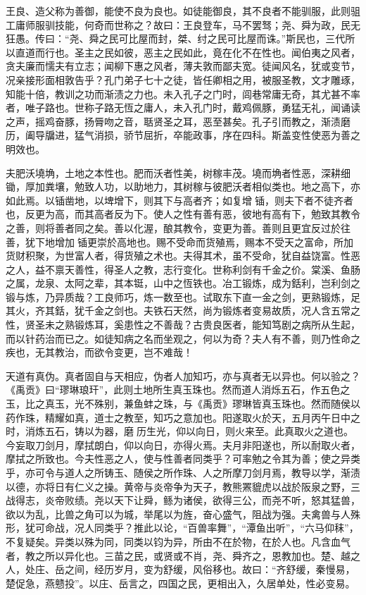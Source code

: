 \documentclass[]{article}
\begin{document}
王良、造父称为善御，能使不良为良也。如徒能御良，其不良者不能驯服，此则驵工庸师服驯技能，何奇而世称之？故曰：王良登车，马不罢驽；尧、舜为政，民无狂愚。传曰：``尧、舜之民可比屋而封，桀、纣之民可比屋而诛。''斯民也，三代所以直道而行也。圣主之民如彼，恶主之民如此，竟在化不在性也。闻伯夷之风者，贪夫廉而懦夫有立志；闻柳下惠之风者，薄夫敦而鄙夫宽。徒闻风名，犹或变节，况亲接形面相敦告乎？孔门弟子七十之徒，皆任卿相之用，被服圣教，文才雕琢，知能十倍，教训之功而渐渍之力也。未入孔子之门时，闾巷常庸无奇，其尤甚不率者，唯子路也。世称子路无恆之庸人，未入孔门时，戴鸡佩豚，勇猛无礼，闻诵读之声，摇鸡奋豚，扬脣吻之音，聒贤圣之耳，恶至甚矣。孔子引而教之，渐渍磨历，阖导牖进，猛气消损，骄节屈折，卒能政事，序在四科。斯盖变性使恶为善之明效也。

夫肥沃墝埆，土地之本性也。肥而沃者性美，树稼丰茂。墝而埆者性恶，深耕细锄，厚加粪壤，勉致人功，以助地力，其树稼与彼肥沃者相似类也。地之高下，亦如此焉。以锸凿地，以埤增下，则其下与高者齐；如复增锸，则夫下者不徒齐者也，反更为高，而其高者反为下。使人之性有善有恶，彼地有高有下，勉致其教令之善，则将善者同之矣。善以化渥，酿其教令，变更为善。善则且更宜反过於往善，犹下地增加锸更崇於高地也。赐不受命而货殖焉，赐本不受天之富命，所加货财积聚，为世富人者，得货殖之术也。夫得其术，虽不受命，犹自益饶富。性恶之人，益不禀天善性，得圣人之教，志行变化。世称利剑有千金之价。棠溪、鱼肠之属，龙泉、太阿之辈，其本铤，山中之恆铁也。冶工锻炼，成为銛利，岂利剑之锻与炼，乃异质哉？工良师巧，炼一数至也。试取东下直一金之剑，更熟锻炼，足其火，齐其銛，犹千金之剑也。夫铁石天然，尚为锻炼者变易故质，况人含五常之性，贤圣未之熟锻炼耳，奚患性之不善哉？古贵良医者，能知笃剧之病所从生起，而以针药治而已之。如徒知病之名而坐观之，何以为奇？夫人有不善，则乃性命之疾也，无其教治，而欲令变更，岂不难哉！

天道有真伪。真者固自与天相应，伪者人加知巧，亦与真者无以异也。何以验之？《禹贡》曰``璆琳琅玕''，此则土地所生真玉珠也。然而道人消烁五石，作五色之玉，比之真玉，光不殊别，兼鱼蚌之珠，与《禹贡》璆琳皆真玉珠也。然而随侯以药作珠，精耀如真，道士之教至，知巧之意加也。阳遂取火於天，五月丙午日中之时，消炼五石，铸以为器，磨历生光，仰以向日，则火来至。此真取火之道也。今妄取刀剑月，摩拭朗白，仰以向日，亦得火焉。夫月非阳遂也，所以耐取火者，摩拭之所致也。今夫性恶之人，使与性善者同类乎？可率勉之令其为善；使之异类乎，亦可令与道人之所铸玉、随侯之所作珠、人之所摩刀剑月焉，教导以学，渐渍以德，亦将日有仁义之操。黄帝与炎帝争为天子，教熊罴貔虎以战於阪泉之野，三战得志，炎帝败绩。尧以天下让舜，鲧为诸侯，欲得三公，而尧不听，怒其猛兽，欲以为乱，比兽之角可以为城，举尾以为旌，奋心盛气，阻战为强。夫禽兽与人殊形，犹可命战，况人同类乎？推此以论，``百兽率舞''，``潭鱼出听''，``六马仰秣''，不复疑矣。异类以殊为同，同类以钧为异，所由不在於物，在於人也。凡含血气者，教之所以异化也。三苗之民，或贤或不肖，尧、舜齐之，恩教加也。楚、越之人，处庄、岳之间，经历岁月，变为舒缓，风俗移也。故曰：``齐舒缓，秦慢易，楚促急，燕戆投''。以庄、岳言之，四国之民，更相出入，久居单处，性必变易。
\end{document}
